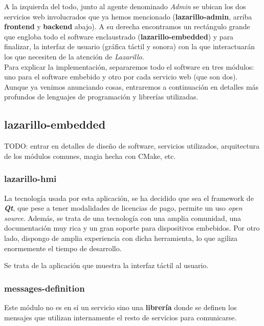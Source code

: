 A la izquierda del todo, junto al agente denominado \textit{Admin} se ubican los dos servicios web involucrados que ya hemos mencionado (\textbf{lazarillo-admin}, arriba \textbf{frontend} y \textbf{backend} abajo). A su derecha encontramos un rectángulo grande que engloba todo el software enclaustrado (\textbf{lazarillo-embedded}) y para finalizar, la interfaz de usuario (gráfica táctil y sonora) con la que interactuarán los que necesiten de la atención de \textit{Lazarillo}.\\

Para explicar la implementación, separaremos todo el software en tres módulos: uno para el software embebido y otro por cada servicio web (que son dos). Aunque ya venimos anunciando cosas, entraremos a continuación en detalles más profundos de lenguajes de programación y librerías utilizadas.\\


\subsection{lazarillo-embedded}

TODO: entrar en detalles de diseño de software, servicios utilizados, arquitectura de los módulos comunes, magia hecha con CMake, etc.

\subsubsection{lazarillo-hmi}

La tecnología usada por esta aplicación, se ha decidido que sea el framework de \textbf{\textit{Qt}}, que pese a tener modalidades de licencias de pago, permite un uso \textit{open source}. Además, se trata de una tecnología con una amplia comunidad, una documentación muy rica y un gran soporte para dispositivos embebidos. Por otro lado, dispongo de amplia experiencia con dicha herramienta, lo que agiliza enormemente el tiempo de desarrollo.

Se trata de la aplicación que muestra la interfaz táctil al usuario.

\subsubsection{messages-definition}

Este módulo no es en sí un servicio sino una \textbf{librería} donde se definen los mensajes que utilizan internamente el resto de servicios para comunicarse.

